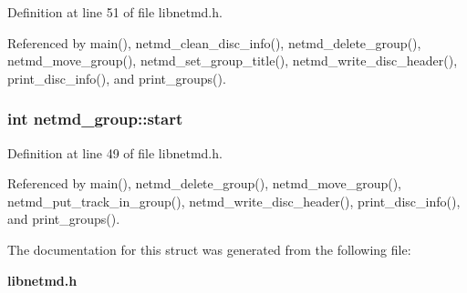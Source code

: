 Definition at line 51 of file libnetmd.h.

Referenced by main(), netmd\_\-clean\_\-disc\_\-info(), netmd\_\-delete\_\-group(), netmd\_\-move\_\-group(), netmd\_\-set\_\-group\_\-title(), netmd\_\-write\_\-disc\_\-header(), print\_\-disc\_\-info(), and print\_\-groups().
\subsubsection[{start}]{\setlength{\rightskip}{0pt plus 5cm}int {\bf netmd\_\-group::start}}\label{structnetmd__group_a0bf5560dfe2867d4a3c014ab100cda24}


Definition at line 49 of file libnetmd.h.

Referenced by main(), netmd\_\-delete\_\-group(), netmd\_\-move\_\-group(), netmd\_\-put\_\-track\_\-in\_\-group(), netmd\_\-write\_\-disc\_\-header(), print\_\-disc\_\-info(), and print\_\-groups().

The documentation for this struct was generated from the following file:\begin{DoxyCompactItemize}
\item 
{\bf libnetmd.h}\end{DoxyCompactItemize}

